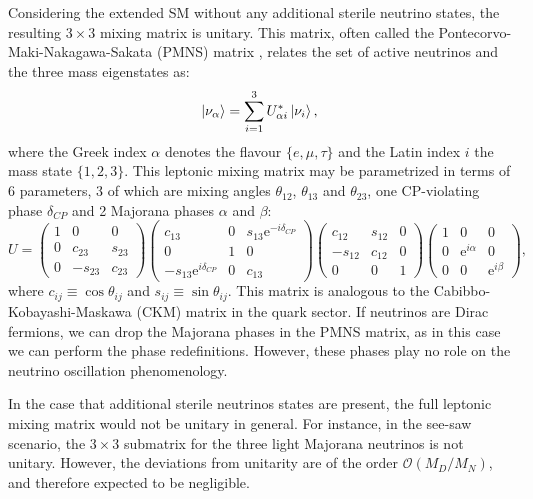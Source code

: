 Considering the extended SM without any additional sterile neutrino states, the  resulting $3 \times 3$ mixing matrix is unitary. This matrix, often called the Pontecorvo-Maki-Nakagawa-Sakata (PMNS) matrix \cite{Pontecorvo1957, Maki1962}, relates the set of active neutrinos and the three mass eigenstates as:
\begin{equation}\label{2.1}
\ket{\nu_{\alpha}} = \sum_{i=1}^{3} U^{*}_{\alpha i} \ket{\nu_{i}},
\end{equation}
where the Greek index $\alpha$ denotes the flavour $\{e,\mu,\tau\}$ and the Latin index $i$ the mass state $\{1,2,3\}$. This leptonic mixing matrix may be parametrized in terms of 6 parameters, 3 of which are mixing angles $\theta_{12}$, $\theta_{13}$ and $\theta_{23}$, one CP-violating phase $\delta_{CP}$ and 2 Majorana phases $\alpha$ and $\beta$:
\begin{equation}\label{2.2}
	U = \begin{pmatrix}1&0&0\\0&c_{23}&s_{23}\\0&-s_{23}&c_{23}\end{pmatrix} \begin{pmatrix}c_{13}&0&s_{13} \mathrm{e}^{-i\delta_{CP}}\\0&1&0\\-s_{13} \mathrm{e}^{i\delta_{CP}}&0&c_{13}\end{pmatrix} \begin{pmatrix}c_{12}&s_{12}&0\\-s_{12}&c_{12}&0\\0&0&1\end{pmatrix} \begin{pmatrix}1&0&0\\0&\mathrm{e}^{i\alpha}&0\\0&0&\mathrm{e}^{i\beta}\end{pmatrix},
\end{equation}
where $c_{ij} \equiv \cos \theta_{ij}$ and $s_{ij} \equiv \sin \theta_{ij}$. This matrix is analogous to the Cabibbo-Kobayashi-Maskawa (CKM) matrix in the quark sector. If neutrinos are Dirac fermions, we can drop the Majorana phases in the PMNS matrix, as in this case we can perform the phase redefinitions. However, these phases play no role on the neutrino oscillation phenomenology.

In the case that additional sterile neutrinos states are present, the full leptonic mixing matrix would not be unitary in general. For instance, in the see-saw scenario, the $3 \times 3$ submatrix for the three light Majorana neutrinos is not unitary. However, the deviations from unitarity are of the order $\mathcal{O}(M_{D}/M_{N})$, and therefore expected to be negligible.

